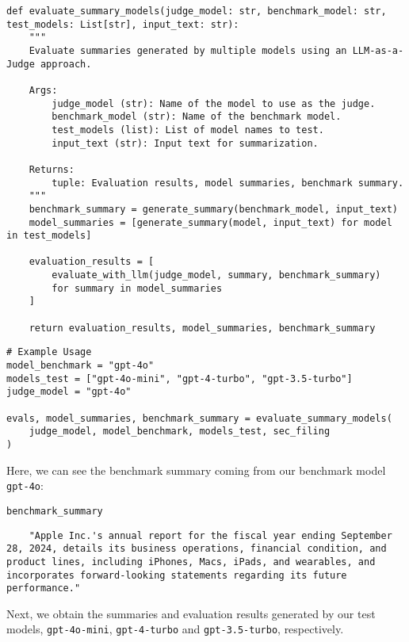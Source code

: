 \begin{verbatim}
def evaluate_summary_models(judge_model: str, benchmark_model: str, test_models: List[str], input_text: str):
    """
    Evaluate summaries generated by multiple models using an LLM-as-a-Judge approach.
    
    Args:
        judge_model (str): Name of the model to use as the judge.
        benchmark_model (str): Name of the benchmark model.
        test_models (list): List of model names to test.
        input_text (str): Input text for summarization.
    
    Returns:
        tuple: Evaluation results, model summaries, benchmark summary.
    """
    benchmark_summary = generate_summary(benchmark_model, input_text)
    model_summaries = [generate_summary(model, input_text) for model in test_models]

    evaluation_results = [
        evaluate_with_llm(judge_model, summary, benchmark_summary)
        for summary in model_summaries
    ]

    return evaluation_results, model_summaries, benchmark_summary
\end{verbatim}

\begin{verbatim}
# Example Usage
model_benchmark = "gpt-4o"
models_test = ["gpt-4o-mini", "gpt-4-turbo", "gpt-3.5-turbo"]
judge_model = "gpt-4o"

evals, model_summaries, benchmark_summary = evaluate_summary_models(
    judge_model, model_benchmark, models_test, sec_filing
)
\end{verbatim}
Here, we can see the benchmark summary coming from our benchmark model \texttt{gpt-4o}:

\begin{verbatim}
benchmark_summary
\end{verbatim}


    \begin{verbatim}
    "Apple Inc.'s annual report for the fiscal year ending September 28, 2024, details its business operations, financial condition, and product lines, including iPhones, Macs, iPads, and wearables, and incorporates forward-looking statements regarding its future performance."
    \end{verbatim}


Next, we obtain the summaries and evaluation results generated by our test models, \texttt{gpt-4o-mini}, \texttt{gpt-4-turbo} and \texttt{gpt-3.5-turbo}, respectively.

